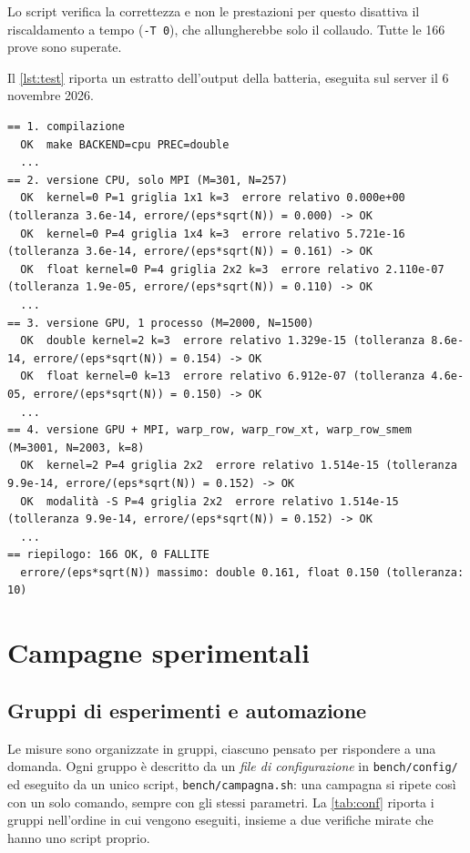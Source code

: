 \documentclass[11pt,a4paper]{article}
\begin{document}
Lo script verifica la correttezza e non le prestazioni per questo disattiva il
riscaldamento a tempo (\texttt{-T 0}), che allungherebbe solo il collaudo.
Tutte le 166 prove sono superate.

Il \cref{lst:test} riporta un estratto dell'output della batteria, eseguita sul
server il 6 novembre 2026.

\begin{lstlisting}[language={}, basicstyle=\ttfamily\scriptsize, numbers=none, caption={Estratto dell'output di \texttt{run\_tests.sh} (\texttt{...} = righe omesse; spazi di allineamento ridotti).}, label={lst:test}]
== 1. compilazione
  OK  make BACKEND=cpu PREC=double
  ...
== 2. versione CPU, solo MPI (M=301, N=257)
  OK  kernel=0 P=1 griglia 1x1 k=3  errore relativo 0.000e+00 (tolleranza 3.6e-14, errore/(eps*sqrt(N)) = 0.000) -> OK
  OK  kernel=0 P=4 griglia 1x4 k=3  errore relativo 5.721e-16 (tolleranza 3.6e-14, errore/(eps*sqrt(N)) = 0.161) -> OK
  OK  float kernel=0 P=4 griglia 2x2 k=3  errore relativo 2.110e-07 (tolleranza 1.9e-05, errore/(eps*sqrt(N)) = 0.110) -> OK
  ...
== 3. versione GPU, 1 processo (M=2000, N=1500)
  OK  double kernel=2 k=3  errore relativo 1.329e-15 (tolleranza 8.6e-14, errore/(eps*sqrt(N)) = 0.154) -> OK
  OK  float kernel=0 k=13  errore relativo 6.912e-07 (tolleranza 4.6e-05, errore/(eps*sqrt(N)) = 0.150) -> OK
  ...
== 4. versione GPU + MPI, warp_row, warp_row_xt, warp_row_smem (M=3001, N=2003, k=8)
  OK  kernel=2 P=4 griglia 2x2  errore relativo 1.514e-15 (tolleranza 9.9e-14, errore/(eps*sqrt(N)) = 0.152) -> OK
  OK  modalità -S P=4 griglia 2x2  errore relativo 1.514e-15 (tolleranza 9.9e-14, errore/(eps*sqrt(N)) = 0.152) -> OK
  ...
== riepilogo: 166 OK, 0 FALLITE
  errore/(eps*sqrt(N)) massimo: double 0.161, float 0.150 (tolleranza: 10)
\end{lstlisting}

\section{Campagne sperimentali}\label{sec:campagne}

\subsection{Gruppi di esperimenti e automazione}\label{sec:gruppi}\label{sec:automazione}

Le misure sono organizzate in gruppi, ciascuno pensato per rispondere a una
domanda. Ogni gruppo è descritto da un \emph{file di configurazione} in
\texttt{bench/config/} ed eseguito da un unico script,
\texttt{bench/campagna.sh}: una campagna si ripete così con un solo comando,
sempre con gli stessi parametri. La \cref{tab:conf} riporta i gruppi
nell'ordine in cui vengono eseguiti, insieme a due verifiche mirate che hanno
uno script proprio.
\end{document}
